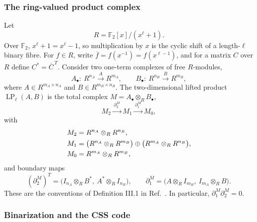 \documentclass[11pt]{article}
\newcommand{\F}{\mathbb{F}}
\begin{document}
\subsubsection{The ring-valued product complex}

Let
\begin{equation}
  R=\F_2[x]/(x^\ell+1).
  \label{eq:ring}
\end{equation}
Over $\F_2$, $x^\ell+1=x^\ell-1$, so multiplication by $x$ is the cyclic
shift of a length-$\ell$ binary fibre. For $f\in R$, write
$\overline f=f(x^{-1})=f(x^{\ell-1})$, and for a matrix $C$ over $R$ define
$C^*=\overline C^{\,T}$. Consider two one-term complexes of free $R$-modules,
\begin{equation}
  A_\bullet:\ R^{n_A}\xrightarrow{\,A\,}R^{m_A},
  \qquad
  B_\bullet:\ R^{n_B}\xrightarrow{\,B\,}R^{m_B},
  \label{eq:base-complexes}
\end{equation}
where $A\in R^{m_A\times n_A}$ and
$B\in R^{m_B\times n_B}$. The two-dimensional lifted product
$\operatorname{LP}_\ell(A,B)$ is the total complex $M=A_\bullet\otimes_R
B_\bullet$,
\begin{equation}
  M_2 \xrightarrow{\,\partial_2^M\,}
  M_1 \xrightarrow{\,\partial_1^M\,} M_0,
  \label{eq:lp-complex}
\end{equation}
with
\begin{align}
  M_2 &= R^{n_A}\otimes_R R^{n_B}, \notag\\
  M_1 &=
  \bigl(R^{n_A}\otimes_R R^{m_B}\bigr)
  \oplus
  \bigl(R^{m_A}\otimes_R R^{n_B}\bigr),
  \label{eq:lp-modules}\\
  M_0 &= R^{m_A}\otimes_R R^{m_B}, \notag
\end{align}
and boundary maps
\begin{equation}
  (\partial_2^M)^T=
  \bigl(I_{n_A}\otimes_R B^*,\ A^*\otimes_R I_{n_B}\bigr),
  \qquad
  \partial_1^M=
  \bigl(A\otimes_R I_{m_B},\ I_{m_A}\otimes_R B\bigr).
  \label{eq:lp-boundaries}
\end{equation}
These are the conventions of Definition III.1 in
Ref.~\cite{ZhengEtAl2026}. In particular,
$\partial_1^M\partial_2^M=0$.

\subsubsection{Binarization and the CSS code}
\end{document}
